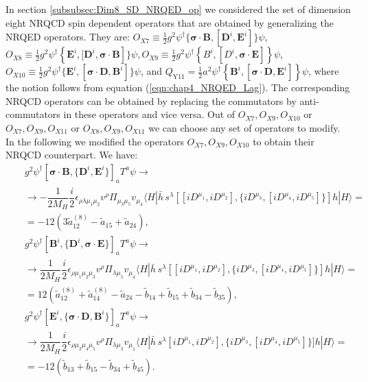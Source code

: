 In section \ref{subsubsec:Dim8_SD_NRQED_op} we considered the set of dimension eight NRQCD spin dependent operators that are obtained by generalizing the NRQED operators. They are: $O_{X 7} \equiv \frac{1}{2} g^{2} \psi^{\dagger}\lbrace\bm{\sigma} \cdot \bm{B},[\bm{D}^{i}, \bm{E}^{i}]\rbrace \psi$, $ O_{X 8} \equiv \frac{1}{2} g^{2} \psi^{\dagger}\left\{\bm{E}^{i},[\bm{D}^{i}, \bm{\sigma} \cdot \bm{B}\right]\} \psi, O_{X 9} \equiv \frac{1}{2} g^{2} \psi^{\dagger}\left\{B^{i},\left[D^{i}, \bm{\sigma}\cdot \bm{E}\right]\right\} \psi$, $O_{X 10} \equiv \frac{1}{2} g^{2} \psi^{\dagger}\lbrace\bm{E}^{i},[\bm{\sigma} \cdot \bm{D}, \bm{B}^{i}]\rbrace \psi$, and $Q_{\mathrm{Y} 11}=\frac{1}{2} a^{2} \psi^{\dagger}\left\{\bm{B}^{i},\left[\bm{\sigma} \cdot \bm{D}, \bm{E}^{i}\right]\right\} \psi$, where the notion follows from equation (\ref{eqn:chap4_NRQED_Lag}). The corresponding NRQCD operators can be obtained by replacing the commutators by anti-commutators in these operators and vice versa. Out of $O_{X 7}, O_{X 9}, O_{X 10}$ or $O_{X 7}, O_{X 9}, O_{X 11}$ or $O_{X 8}, O_{X 9}, O_{X 11}$ we can choose any set of operators to modify. In the following we modified the operators $O_{X 7}, O_{X 9}, O_{X 10}$ to obtain their NRQCD counterpart. We have:
\vspace{-1cm}
\begin{eqnarray}\label{NRQCD8SD}
&&g^2 \psi^\dagger [\bm{\sigma}\cdot\bm{B}, \{\bm{D}^i,\bm{E}^i\}]_aT^a\psi\to\nonumber\\
&&\to  -\dfrac1{2M_H}\dfrac{i}2\epsilon_{\rho\lambda\mu_1\mu_2}v^\rho \Pi_{\mu_3\mu_5}v_{\mu_4}\langle H |\bar h\,s^\lambda [[iD^{\mu_1},iD^{\mu_2}],\{iD^{\mu_3},[iD^{\mu_4},iD^{\mu_5}]\}]h|H\rangle=\nonumber\\
&&=-12\left(3 \tilde{a}_{12}^{(8)}- \tilde{a}_{15}+ \tilde{a}_{24}\right),\nonumber\\
&&g^2  \psi^\dagger [\bm{B}^i,\{\bm{D}^i,\bm{\sigma}\cdot\bm{E}\}]_aT^a\psi\to\nonumber\\
&&\to  \dfrac1{2M_H}\dfrac{i}2\epsilon_{\rho\mu_1\mu_2\mu_3}v^\rho \Pi_{\lambda\mu_5}v_{\mu_4}\langle H |\bar h\,s^\lambda [[iD^{\mu_1},iD^{\mu_2}],\{iD^{\mu_3},[iD^{\mu_4},iD^{\mu_5}]\}]h|H\rangle=\nonumber\\
&&=12\left(\tilde{a}_{12}^{(8)}+ \tilde{a}_{14}^{(8)}- \tilde{a}_{24}-\tilde{b}_{14}+\tilde{b}_{15}+\tilde{b}_{34}-\tilde{b}_{35}\right),\nonumber
\end{eqnarray}
\begin{eqnarray}
&&g^2  \psi^\dagger [\bm{E}^i, \{\bm{\sigma}\cdot\bm{D}, \bm{B}^i\}]_aT^a\psi\to\nonumber\\
&&\to  \dfrac1{2M_H}\dfrac{i}2\epsilon_{\rho\mu_2\mu_4\mu_5}v^\rho \Pi_{\lambda\mu_3}v_{\mu_1}\langle H |\bar h\,s^\lambda [iD^{\mu_1},iD^{\mu_2}],\{iD^{\mu_3},[iD^{\mu_4},iD^{\mu_5}]\}]h|H\rangle=\nonumber\\
&&=-12\left(\tilde{b}_{13}+\tilde{b}_{15}-\tilde{b}_{34}+\tilde{b}_{45}\right).
\end{eqnarray}


